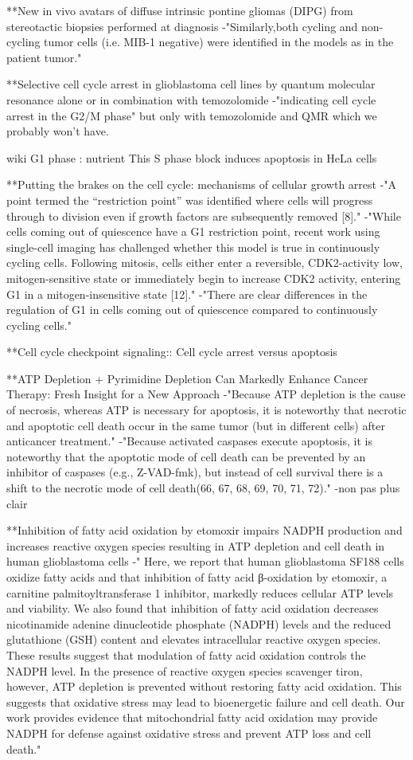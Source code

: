 \documentclass[11pt,a4paper]{article}
\begin{document}
**New in vivo avatars of diffuse intrinsic pontine gliomas (DIPG)
from stereotactic biopsies performed at diagnosis
-"Similarly,both cycling and non-cycling tumor cells (i.e. MIB-1
negative) were identified in the models as in the patient
tumor."


**Selective cell cycle arrest in glioblastoma cell lines by quantum molecular resonance alone or in combination with temozolomide
-"indicating cell cycle arrest in the G2/M phase" but only with temozolomide and QMR which we probably won't have.

wiki 
G1 phase : nutrient
This S phase block induces apoptosis in HeLa cells

**Putting the brakes on the cell cycle: mechanisms of cellular growth arrest
-"A point termed the “restriction point” was identified where cells will progress through to division even if growth factors are subsequently removed [8]."
-"While cells coming out of quiescence have a G1 restriction point, recent work using single-cell imaging has challenged whether this model is true in continuously cycling cells. Following mitosis, cells either enter a reversible, CDK2-activity low, mitogen-sensitive state or immediately begin to increase CDK2 activity, entering G1 in a mitogen-insensitive state [12]."
-"There are clear differences in the regulation of G1 in cells coming out of quiescence compared to continuously cycling cells."

**Cell cycle checkpoint signaling:: Cell cycle arrest versus apoptosis

**ATP Depletion + Pyrimidine Depletion Can Markedly Enhance Cancer Therapy: Fresh Insight for a New Approach
-"Because ATP depletion is the cause of necrosis, whereas ATP is necessary for apoptosis, it is noteworthy that necrotic and apoptotic cell death occur in the same tumor (but in different cells) after anticancer treatment."
-"Because activated caspases execute apoptosis, it is noteworthy that the apoptotic mode of cell death can be prevented by an inhibitor of caspases (e.g., Z-VAD-fmk), but instead of cell survival there is a shift to the necrotic mode of cell death(66, 67, 68, 69, 70, 71, 72)."
-non pas plus clair

**Inhibition of fatty acid oxidation by etomoxir impairs NADPH production and increases reactive oxygen species resulting in ATP depletion and cell death in human glioblastoma cells
-" Here, we report that human glioblastoma SF188 cells oxidize fatty acids and that inhibition of fatty acid β-oxidation by etomoxir, a carnitine palmitoyltransferase 1 inhibitor, markedly reduces cellular ATP levels and viability. We also found that inhibition of fatty acid oxidation decreases nicotinamide adenine dinucleotide phosphate (NADPH) levels and the reduced glutathione (GSH) content and elevates intracellular reactive oxygen species. These results suggest that modulation of fatty acid oxidation controls the NADPH level. In the presence of reactive oxygen species scavenger tiron, however, ATP depletion is prevented without restoring fatty acid oxidation. This suggests that oxidative stress may lead to bioenergetic failure and cell death. Our work provides evidence that mitochondrial fatty acid oxidation may provide NADPH for defense against oxidative stress and prevent ATP loss and cell death."
\end{document}
